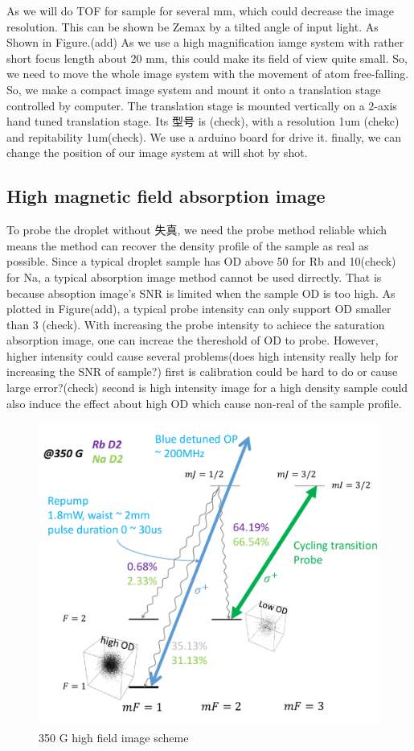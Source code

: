 As we will do TOF for sample for several mm, which could decrease the image resolution. This can be shown be Zemax by a tilted angle of input light. As Shown in Figure.(add) As we use a high magnification iamge system with rather short focus length about 20 mm, this could make its field of view quite small. So, we need to move the whole image system with the movement of atom free-falling. So, we make a compact image system and mount it onto a translation stage controlled by computer. The translation stage is mounted vertically on a 2-axis hand tuned translation stage. Its 型号 is (check), with a resolution 1um (chekc) and repitability 1um(check). We use a arduino board for drive it. finally, we can change the position of our image system at will shot by shot.

\subsection{High magnetic field absorption image}
To probe the droplet without 失真, we need the probe method reliable which means the method can recover the density profile of the sample as real as possible. Since a typical droplet sample has OD above 50 for Rb and 10(check) for Na, a typical absorption image method cannot be used dirrectly. That is because absoption image's SNR is limited when the sample OD is too high. As plotted in Figure(add), a typical probe intensity can only support OD smaller than 3 (check). With increasing the probe intensity to achiece the saturation absorption image, one can increae the thereshold of OD to probe. However, higher intensity could cause several problems(does high intensity really help for increasing the SNR of sample?) first is calibration could be hard to do or cause large error?(check) second is high intensity image for a high density sample could also induce the effect about high OD which cause non-real of the sample profile. 

\begin{figure}[hb]
\begin{center}
\includegraphics[width = 0.8\linewidth]{figures/High-field image scheme.pdf}
\end{center}
\caption{350 G high field image scheme}
\label{High-field image scheme}
\end{figure}

